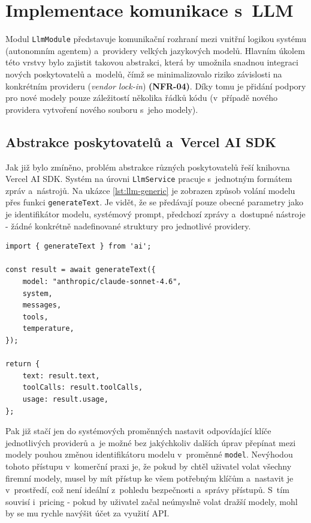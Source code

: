 \documentclass[czech, ing, kiv, he, iso690numb, viewonly]{fasthesis}
\begin{document}
\section{Implementace komunikace s~LLM}
Modul \texttt{LlmModule} představuje komunikační rozhraní mezi vnitřní logikou systému 
(autonomním agentem) a~providery velkých jazykových modelů.
Hlavním úkolem této vrstvy bylo zajistit takovou abstrakci, 
která by umožnila snadnou integraci nových poskytovatelů a~modelů, čímž 
se minimalizovalo riziko závislosti na konkrétním provideru (\textit{vendor lock-in}) \textbf{(NFR-04)}.
Díky tomu je přidání podpory pro nové modely pouze záležitostí několika
řádků kódu (v~případě nového providera vytvoření nového souboru s~jeho modely).

\subsection{Abstrakce poskytovatelů a~Vercel AI SDK}
Jak již bylo zmíněno, problém abstrakce různých poskytovatelů řeší knihovna Vercel AI SDK.
Systém na úrovni \texttt{LlmService} pracuje s~jednotným formátem zpráv a~nástrojů.
Na ukázce \ref{lst:llm-generic} je zobrazen způsob volání modelu přes funkci \texttt{generateText}.
Je vidět, že se předávají pouze obecné parametry jako je identifikátor modelu, systémový prompt, 
předchozí zprávy a~dostupné nástroje - žádné konkrétně nadefinované struktury pro jednotlivé providery.

\begin{lstlisting}[style=tscode, caption={Ukázkové volání LLM přes Vercel AI SDK.}, label={lst:llm-generic}]
import { generateText } from 'ai';

const result = await generateText({
    model: "anthropic/claude-sonnet-4.6",
    system,
    messages,
    tools,
    temperature,
});

return {
    text: result.text,
    toolCalls: result.toolCalls,
    usage: result.usage,
};
\end{lstlisting}

Pak již stačí jen do systémových proměnných nastavit odpovídající klíče jednotlivých providerů 
a~je možné bez jakýchkoliv dalších úprav přepínat mezi modely pouhou změnou identifikátoru modelu v~proměnné \texttt{model}.
Nevýhodou tohoto přístupu v~komerční praxi je, že pokud by chtěl uživatel volat všechny firemní modely, 
musel by mít přístup ke všem potřebným klíčům a~nastavit je v~prostředí, což není ideální z~pohledu bezpečnosti a~správy přístupů.
S~tím souvisí i~pricing - pokud by uživatel začal neúmyslně volat dražší modely, mohl by se mu rychle navýšit účet za využití API.
\end{document}
